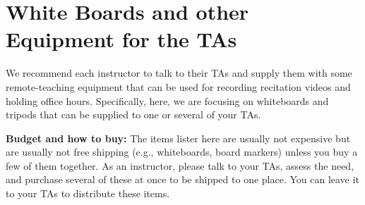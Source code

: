 \chapter{White Boards and other Equipment for the TAs}

\begin{gram}
We recommend each instructor to talk to their TAs and supply them with
some remote-teaching equipment that can be used for recording recitation videos and holding office hours.  
%
Specifically, here, we are focusing on whiteboards and tripods that can be supplied to one or several of your TAs.
%

\textbf{Budget and how to buy:} The items lister here are usually not
expensive but are usually not free shipping (e.g., whiteboards, board
markers) unless you buy a few of them together.
%
As an instructor, please  talk to your TAs, assess the need, and
purchase several of these at once to be shipped to one place.
%
You can leave it to your TAs to distribute these items.

\end{gram}



